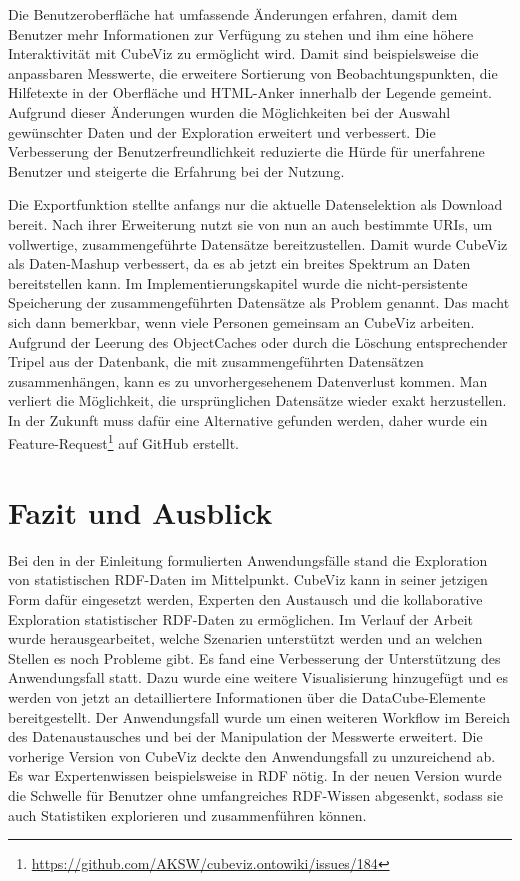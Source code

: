 \documentclass[11pt]{article}
\begin{document}
Die Benutzeroberfläche hat umfassende Änderungen erfahren, damit dem Benutzer mehr Informationen zur Verfügung zu stehen und ihm eine höhere Interaktivität mit CubeViz zu ermöglicht wird. Damit sind beispielsweise die anpassbaren Messwerte, die erweitere Sortierung von Beobachtungspunkten, die Hilfetexte in der Oberfläche und HTML-Anker innerhalb der Legende gemeint. Aufgrund dieser Änderungen wurden die Möglichkeiten bei der Auswahl gewünschter Daten und der Exploration erweitert und verbessert. Die Verbesserung der Benutzerfreundlichkeit reduzierte die Hürde für unerfahrene Benutzer und steigerte die Erfahrung bei der Nutzung.

Die Exportfunktion stellte anfangs nur die aktuelle Datenselektion als Download bereit. Nach ihrer Erweiterung nutzt sie von nun an auch bestimmte URIs, um vollwertige, zusammengeführte Datensätze bereitzustellen. Damit wurde CubeViz als Daten-Mashup verbessert, da es ab jetzt ein breites Spektrum an Daten bereitstellen kann. Im Implementierungskapitel wurde die nicht-persistente Speicherung der zusammengeführten Datensätze als Problem genannt. Das macht sich dann bemerkbar, wenn viele Personen gemeinsam an CubeViz arbeiten. Aufgrund der Leerung des ObjectCaches oder durch die Löschung entsprechender Tripel aus der Datenbank, die mit zusammengeführten Datensätzen zusammenhängen,  kann es zu unvorhergesehenem Datenverlust kommen. Man verliert die Möglichkeit, die ursprünglichen Datensätze wieder exakt herzustellen. In der Zukunft muss dafür eine Alternative gefunden werden, daher wurde ein Feature-Request\footnote{\url{https://github.com/AKSW/cubeviz.ontowiki/issues/184}} auf GitHub erstellt.
 
 

%
%
\newpage
\section{Fazit und Ausblick}
\label{sec:chapterFazit}

Bei den in der Einleitung formulierten Anwendungsfälle stand die Exploration von statistischen RDF-Daten im Mittelpunkt. CubeViz kann in seiner jetzigen Form dafür eingesetzt werden, Experten den Austausch und die kollaborative Exploration statistischer RDF-Daten zu ermöglichen. Im Verlauf der Arbeit wurde herausgearbeitet, welche Szenarien unterstützt werden und an welchen Stellen es noch Probleme gibt. Es fand eine Verbesserung der Unterstützung des Anwendungsfall  statt. Dazu wurde eine weitere Visualisierung hinzugefügt und es werden von jetzt an detailliertere Informationen über die DataCube-Elemente bereitgestellt. Der Anwendungsfall  wurde um einen weiteren Workflow im Bereich des Datenaustausches und bei der Manipulation der Messwerte erweitert. Die vorherige Version von CubeViz deckte den Anwendungsfall  zu unzureichend ab. Es war Expertenwissen beispielsweise in RDF nötig. In der neuen Version wurde die Schwelle für Benutzer ohne umfangreiches RDF-Wissen abgesenkt, sodass sie auch Statistiken explorieren und zusammenführen können.
\end{document}
